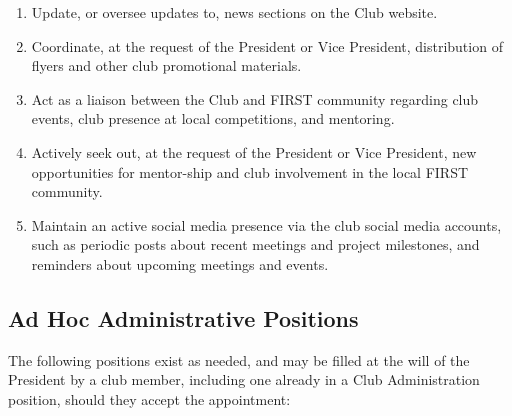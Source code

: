 \documentclass[english,11pt]{article}
\begin{document}
\begin{enumerate}[label=\Alph*.]
    \item Update, or oversee updates to, news sections on the Club website.
    \item Coordinate, at the request of the President or Vice President, distribution of flyers and other club promotional materials.
    \item Act as a liaison between the Club and FIRST community regarding club events, club presence at local competitions, and mentoring.
    \item Actively seek out, at the request of the President or Vice President, new opportunities for mentor-ship and club involvement in the local FIRST community.
    \item Maintain an active social media presence via the club social media accounts, such as periodic posts about recent meetings and project milestones, and reminders about upcoming meetings and events.
\end{enumerate}

\subsection{Ad Hoc Administrative Positions} \label{sect:cadmin:adhoc}
The following positions exist as needed, and may be filled at the will of the President by a club member, including one already in a Club Administration position, should they accept the appointment:
\end{document}
